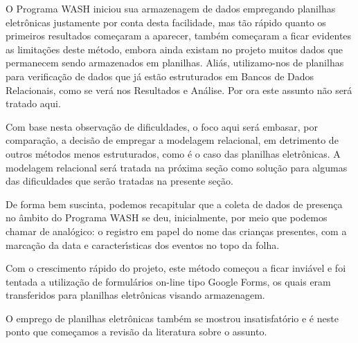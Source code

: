 \documentclass[
12pt,		%
openright,	%
twoside,  %
a4paper,			%
chapter=TITLE,		%
english,			%
french,				%
spanish,			%
brazil				%
]{USPSC-classe/USPSC}
\begin{document}
O Programa WASH iniciou sua armazenagem de dados empregando planilhas eletr\^onicas justamente por conta desta facilidade, mas t\~ao r\'apido quanto os primeiros resultados come\c{c}aram a aparecer, tamb\'em come\c{c}aram a ficar evidentes as limita\c{c}\~oes deste m\'etodo, embora ainda existam no projeto muitos dados que permanecem sendo armazenados em planilhas. Ali\'as, utilizamo-nos de planilhas para verifica\c{c}\~ao de dados que j\'a est\~ao estruturados em Bancos de Dados Relacionais, como se ver\'a nos Resultados e An\'alise. Por ora este assunto n\~ao ser\'a tratado aqui.









Com base nesta observa\c{c}\~ao de dificuldades, o foco aqui ser\'a embasar, por compara\c{c}\~ao, a decis\~ao de empregar a modelagem relacional, em detrimento de outros m\'etodos menos estruturados, como \'e o caso das planilhas eletr\^onicas. A modelagem relacional ser\'a tratada na pr\'oxima se\c{c}\~ao como solu\c{c}\~ao para algumas das dificuldades que ser\~ao tratadas na presente se\c{c}\~ao.









De forma bem suscinta, podemos recapitular que a coleta de dados de presen\c{c}a no \^ambito do Programa WASH se deu, inicialmente, por meio que podemos chamar de anal\'ogico: o registro em papel do nome das crian\c{c}as presentes, com a marca\c{c}\~ao da data e caracter\'{\i}sticas dos eventos no topo da folha.









Com o crescimento r\'apido do projeto, este m\'etodo come\c{c}ou a ficar invi\'avel e foi tentada a utiliza\c{c}\~ao de formul\'arios on-line tipo \textquotedbl Google Forms\textquotedbl , os quais eram transferidos para planilhas eletr\^onicas visando armazenagem.









O emprego de planilhas eletr\^onicas tamb\'em se mostrou insatisfat\'orio e \'e neste ponto que come\c{c}amos a revis\~ao da literatura sobre o assunto.
\end{document}
